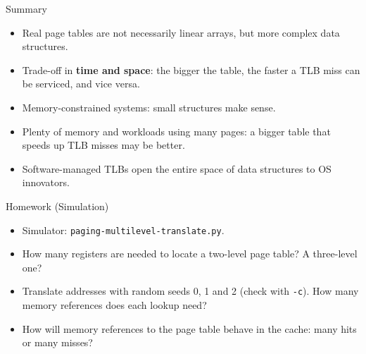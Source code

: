\begin{frame}{Summary}

\begin{itemize}
    \item Real page tables are not necessarily linear arrays, but more
          complex data structures.
    \item Trade-off in \textbf{time and space}: the bigger the table,
          the faster a TLB miss can be serviced, and vice versa.
    \item Memory-constrained systems: small structures make sense.
    \item Plenty of memory and workloads using many pages:
          a bigger table that speeds up TLB misses may be better.
    \item Software-managed TLBs open the entire space of data structures
          to OS innovators.
\end{itemize}

\end{frame}

\begin{frame}{Homework (Simulation)}

\begin{itemize}
    \item Simulator: \texttt{paging-multilevel-translate.py}.
    \item How many registers are needed to locate a two-level page table?
          A three-level one?
    \item Translate addresses with random seeds 0, 1 and 2 (check with
          \texttt{-c}). How many memory references does each lookup need?
    \item How will memory references to the page table behave in the
          cache: many hits or many misses?
\end{itemize}

\end{frame}
